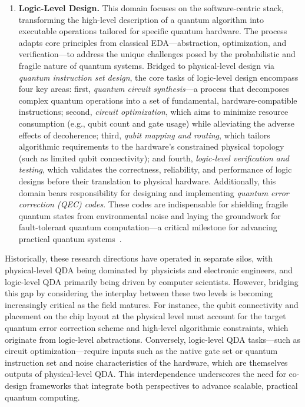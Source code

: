 \documentclass[a4paper,onecolumn,11pt,unpublished]{quantumarticle}
\begin{document}
\begin{enumerate}
\item \textbf{Logic-Level Design.}
This domain focuses on the software-centric stack, transforming the high-level description of a quantum algorithm into executable operations tailored for specific quantum hardware. 
The process adapts core principles from classical EDA---abstraction, optimization, and verification---to address the unique challenges posed by the probabilistic and fragile nature of quantum systems. 
Bridged to physical-level design via \textit{quantum instruction set design}, the core tasks of logic-level design encompass four key areas: first, \textit{quantum circuit synthesis}---a process that decomposes complex quantum operations into a set of fundamental, hardware-compatible instructions; second, \textit{circuit optimization}, which aims to minimize resource consumption (e.g., qubit count and gate usage) while alleviating the adverse effects of decoherence; third, \textit{qubit mapping and routing}, which tailors algorithmic requirements to the hardware's constrained physical topology (such as limited qubit connectivity); and fourth, \textit{logic-level verification and testing}, which validates the correctness, reliability, and performance of logic designs before their translation to physical hardware. Additionally, this domain bears responsibility for designing and implementing \textit{quantum error correction (QEC) codes}. These codes are indispensable for shielding fragile quantum states from environmental noise and laying the groundwork for fault-tolerant quantum computation---a critical milestone for advancing practical quantum systems~\cite{Terhal2015QECreview}.

\end{enumerate}

Historically, these research directions have operated in separate silos, with physical-level QDA being dominated by physicists and electronic engineers, and logic-level QDA primarily being driven by computer scientists.
However, bridging this gap by considering the interplay between these two levels is becoming increasingly critical as the field matures.
For instance, the qubit connectivity and placement on the chip layout at the physical level must account for the target quantum error correction scheme and high-level algorithmic constraints, which originate from logic-level abstractions.
Conversely, logic-level QDA tasks---such as circuit optimization---require inputs such as the native gate set or quantum instruction set and noise characteristics of the hardware, which are themselves outputs of physical-level QDA.
This interdependence underscores the need for co-design frameworks that integrate both perspectives to advance scalable, practical quantum computing.
\end{document}
